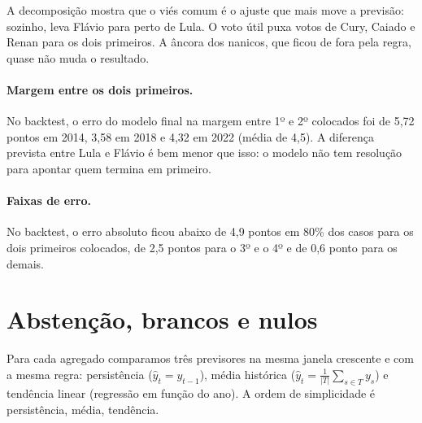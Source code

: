 \documentclass[10.5pt,a4paper]{article}
\begin{document}
A decomposição mostra que o viés comum é o ajuste que mais move a previsão: sozinho, leva Flávio para perto de Lula. O voto útil puxa votos de Cury, Caiado e Renan para os dois primeiros. A âncora dos nanicos, que ficou de fora pela regra, quase não muda o resultado.

\paragraph{Margem entre os dois primeiros.} No backtest, o erro do modelo final na margem entre 1º e 2º colocados foi de 5,72 pontos em 2014, 3,58 em 2018 e 4,32 em 2022 (média de 4,5). A diferença prevista entre Lula e Flávio é bem menor que isso: o modelo não tem resolução para apontar quem termina em primeiro.

\paragraph{Faixas de erro.} No backtest, o erro absoluto ficou abaixo de 4,9 pontos em 80\% dos casos para os dois primeiros colocados, de 2,5 pontos para o 3º e o 4º e de 0,6 ponto para os demais.

\section{Abstenção, brancos e nulos}

Para cada agregado comparamos três previsores na mesma janela crescente e com a mesma regra: persistência ($\hat y_t=y_{t-1}$), média histórica ($\hat y_t=\frac{1}{|T|}\sum_{s\in T}y_s$) e tendência linear (regressão em função do ano). A ordem de simplicidade é persistência, média, tendência.
\end{document}
